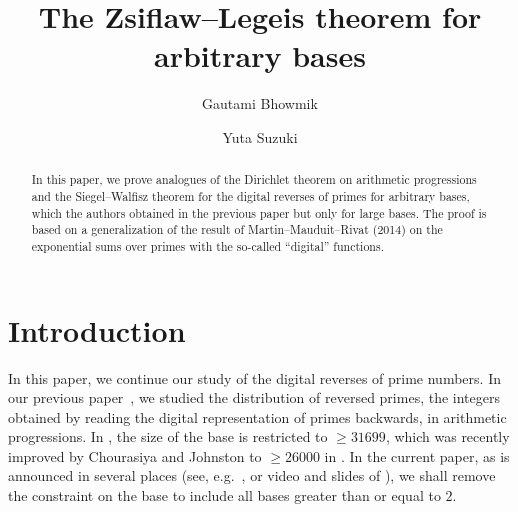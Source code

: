 \documentclass[hidelinks]{amsart}
\numberwithin{equation}{section}
\theoremstyle{plain}
\theoremstyle{definition}
\begin{document}
\title[The Zsiflaw--Legeis theorem for arbitrary bases]
{The Zsiflaw--Legeis theorem for arbitrary bases}
\author[G. Bhowmik]{Gautami Bhowmik}
\author[Y. Suzuki]{Yuta Suzuki}

\begin{abstract}
In this paper,
we prove analogues of the Dirichlet theorem on arithmetic progressions
and the Siegel--Walfisz theorem for the digital reverses of primes for arbitrary bases,
which the authors obtained in the previous paper but only for large bases.
The proof is based on a generalization of the result of Martin--Mauduit--Rivat (2014)
on the exponential sums over primes with the so-called ``digital'' functions.
\end{abstract}

\maketitle

\section{Introduction}
\label{sec:intro}
In this paper,
we continue our study \cite{BhowmikSuzuki:Telhcirid} of the digital reverses of prime numbers.
In our previous paper~\cite{BhowmikSuzuki:Telhcirid},
we studied the distribution of reversed primes,
the integers obtained by reading the digital representation of primes backwards, in arithmetic progressions.
In \cite{BhowmikSuzuki:Telhcirid}, the size of the base is restricted to $\ge31699$,
which was recently improved by Chourasiya and Johnston to $\ge26000$ in \cite{ChourasiyaJohnston}.
In the current paper, as is announced in several places (see, e.g.~\cite[Subsection~1.2]{ChourasiyaJohnston},
or video and slides of \cite{Suzuki:OWNS}),
we shall remove the constraint on the base to include all bases greater than or equal to $2$.
\end{document}
